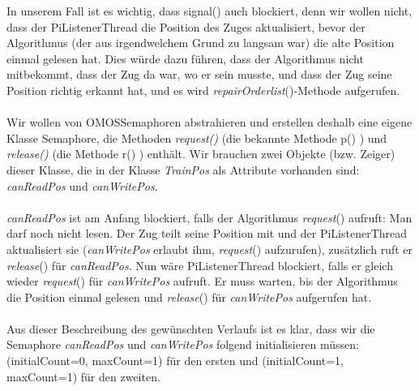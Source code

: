 In unserem Fall ist es wichtig, dass signal() auch blockiert, denn wir wollen nicht, dass der PiListenerThread die Position des Zuges aktualisiert, bevor der Algorithmus (der aus irgendwelchem Grund zu langsam war) die alte Position einmal gelesen hat. Dies würde dazu führen, dass der Algorithmus nicht mitbekommt, dass der Zug da war, wo er sein musste, und dass der Zug seine Position richtig erkannt hat, und es wird \textit{repairOrderlist}()-Methode aufgerufen.\\
\\
Wir wollen von OMOSSemaphoren abstrahieren und erstellen deshalb eine eigene Klasse Semaphore, die Methoden \textit{request()} (die bekannte Methode p() ) und \textit{release()} (die Methode r() ) enthält. Wir brauchen zwei Objekte (bzw. Zeiger) dieser Klasse, die in der Klasse \textit{TrainPos} als Attribute vorhanden sind: \textit{canReadPos} und \textit{canWritePos}.\\
\\
\textit{canReadPos} ist am Anfang blockiert, falls der Algorithmus \textit{request}() aufruft: Man darf noch nicht lesen. Der Zug teilt seine Position mit und der PiListenerThread aktualisiert sie (\textit{canWritePos} erlaubt ihm, \textit{request}() aufzurufen), zusätzlich ruft er \textit{release}() für \textit{canReadPos}. Nun wäre PiListenerThread blockiert, falls er gleich wieder \textit{request}() für \textit{canWritePos} aufruft. Er muss warten, bis der Algorithmus die Position einmal gelesen und \textit{release}() für \textit{canWritePos} aufgerufen hat.\\
\\
Aus dieser Beschreibung des gewünschten Verlaufs ist es klar, dass wir die Semaphore \textit{canReadPos} und \textit{canWritePos} folgend initialisieren müssen: (initialCount=0, maxCount=1) für den ersten und (initialCount=1, maxCount=1) für den zweiten.\\
%
